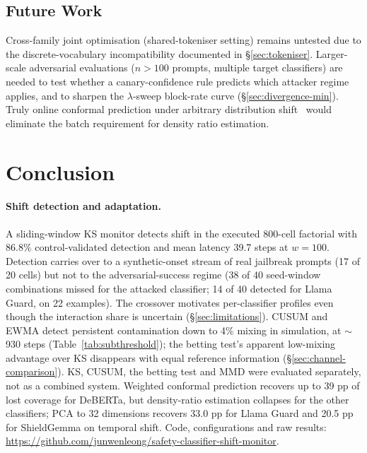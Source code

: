 \documentclass{article}
\begin{document}
\subsection{Future Work}
\label{sec:future}

Cross-family joint optimisation (shared-tokeniser setting) remains untested due to the discrete-vocabulary incompatibility documented in \S\ref{sec:tokeniser}. Larger-scale adversarial evaluations ($n > 100$ prompts, multiple target classifiers) are needed to test whether a canary-confidence rule predicts which attacker regime applies, and to sharpen the $\lambda$-sweep block-rate curve (\S\ref{sec:divergence-min}). Truly online conformal prediction under arbitrary distribution shift~\citep{gibbs2021adaptive} would eliminate the batch requirement for density ratio estimation.

\section{Conclusion}
\label{sec:conclusion}

\paragraph{Shift detection and adaptation.} A sliding-window KS monitor detects shift in the executed 800-cell factorial with 86.8\% control-validated detection and mean latency 39.7 steps at $w{=}100$. Detection carries over to a synthetic-onset stream of real jailbreak prompts (17 of 20 cells) but not to the adversarial-success regime (38 of 40 seed-window combinations missed for the attacked classifier; 14 of 40 detected for Llama Guard, on 22 examples). The crossover motivates per-classifier profiles even though the interaction share is uncertain (\S\ref{sec:limitations}). CUSUM and EWMA detect persistent contamination down to 4\% mixing in simulation, at ${\sim}$930 steps (Table~\ref{tab:subthreshold}); the betting test's apparent low-mixing advantage over KS disappears with equal reference information (\S\ref{sec:channel-comparison}). KS, CUSUM, the betting test and MMD were evaluated separately, not as a combined system. Weighted conformal prediction recovers up to 39 pp of lost coverage for DeBERTa, but density-ratio estimation collapses for the other classifiers; PCA to 32 dimensions recovers 33.0 pp for Llama Guard and 20.5 pp for ShieldGemma on temporal shift. Code, configurations and raw results: \url{https://github.com/junwenleong/safety-classifier-shift-monitor}.
\end{document}
